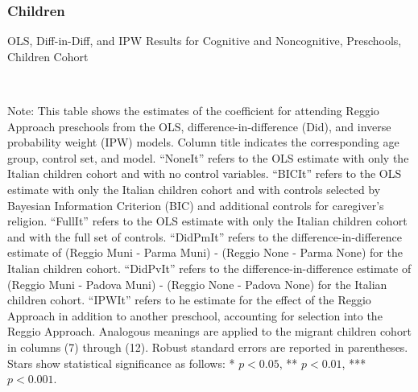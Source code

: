 \begin{landscape}
\subsubsection{Children}
\begin{table}[H] \caption{OLS, Diff-in-Diff, and IPW Results for Cognitive and Noncognitive, Preschools, Children Cohort} \label{ols-E-reg}
\scalebox{0.80}{}
\vspace{1ex} \\
\footnotesize\raggedright{Note: This table shows the estimates of the coefficient for attending Reggio Approach preschools from the OLS, difference-in-difference (Did), and inverse probability weight (IPW) models. Column title indicates the corresponding age group, control set, and model. ``NoneIt'' refers to the OLS estimate with only the Italian children cohort and with no control variables. ``BICIt'' refers to the OLS estimate with only the Italian children cohort and with controls selected by Bayesian Information Criterion (BIC) and additional controls for caregiver's religion. ``FullIt'' refers to the OLS estimate with only the Italian children cohort and with the full set of controls. ``DidPmIt'' refers to the difference-in-difference estimate of (Reggio Muni - Parma Muni) - (Reggio None - Parma None) for the Italian children cohort. ``DidPvIt'' refers to the difference-in-difference estimate of (Reggio Muni - Padova Muni) - (Reggio None - Padova None) for the Italian children cohort. ``IPWIt'' refers to he estimate for the effect of the Reggio Approach in addition to another preschool, accounting for selection into the Reggio Approach. Analogous meanings are applied to the migrant children cohort in columns (7) through (12). Robust standard errors are reported in parentheses. Stars show statistical significance as follows: * $p < 0.05$, ** $p < 0.01$, *** $p < 0.001$.}
\end{table}



\end{landscape}
